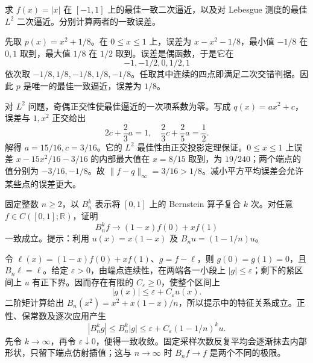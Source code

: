 \begin{exercise}[绝对值函数的两种二次逼近]\label{b2:ex:approximation-absolute-value}
求 \(f(x)=|x|\) 在 \([-1,1]\) 上的最佳一致二次逼近，以及对 Lebesgue 测度的最佳 \(L^2\) 二次逼近。分别计算两者的一致误差。
\end{exercise}
\begin{solution}
先取 \(p(x)=x^2+1/8\)。在 \(0\leq x\leq1\) 上，误差为 \(x-x^2-1/8\)，最小值 \(-1/8\) 在 \(0,1\) 取到，最大值 \(1/8\) 在 \(1/2\) 取到。误差是偶函数，于是它在
\[
 -1,-1/2,0,1/2,1
\]
依次取 \(-1/8,1/8,-1/8,1/8,-1/8\)。任取其中连续的四点即满足二次交错判据。因此 \(p\) 是唯一的最佳一致逼近，误差为 \(1/8\)。

对 \(L^2\) 问题，奇偶正交性使最佳逼近的一次项系数为零。写成 \(q(x)=a x^2+c\)，误差与 \(1,x^2\) 正交给出
\[
 2c+\frac23a=1,\quad \frac23c+\frac25a=\frac12.
\]
解得 \(a=15/16,c=3/16\)。它的 \(L^2\) 最佳性由正交投影定理保证。\(0\leq x\leq1\) 上误差 \(x-15x^2/16-3/16\) 的内部最大值在 \(x=8/15\) 取到，为 \(19/240\)；两个端点的值分别为 \(-3/16,-1/8\)。故 \(\|f-q\|_\infty=3/16>1/8\)。减小平方平均误差会允许某些点的误差更大。
\end{solution}

\begin{exercise}\label{b2:ex:approximation-bernstein-iterates}
固定整数 \(n\geq2\)，以 \(B_n^k\) 表示将 \([0,1]\) 上的 Bernstein 算子复合 \(k\) 次。对任意 \(f\in C([0,1];\mathbb R)\)，证明
\[
 B_n^k f\longrightarrow (1-x)f(0)+xf(1)
\]
一致成立。提示：利用 \(u(x)=x(1-x)\) 及 \(B_nu=(1-1/n)u\)。
\end{exercise}
\begin{solution}
令 \(\ell(x)=(1-x)f(0)+xf(1)\)、\(g=f-\ell\)，则 \(g(0)=g(1)=0\)，且 \(B_n\ell=\ell\)。给定 \(\varepsilon>0\)，由端点连续性，在两端各一小段上 \(|g|\leq\varepsilon\)；剩下的紧区间上 \(u\) 有正下界。因而存在有限的 \(C_\varepsilon\geq0\)，使整个区间上
\[
 |g(x)|\leq\varepsilon+C_\varepsilon u(x).
\]
二阶矩计算给出 \(B_n(x^2)=x^2+x(1-x)/n\)，所以提示中的特征关系成立。正性、保常数及逐次应用产生
\[
 |B_n^k g|\leq B_n^k|g|
 \leq\varepsilon+C_\varepsilon(1-1/n)^ku.
\]
先令 \(k\to\infty\)，再令 \(\varepsilon\downarrow0\)，便得一致收敛。固定采样次数反复平均会逐渐抹去内部形状，只留下端点仿射插值；这与 \(n\to\infty\) 时 \(B_nf\to f\) 是两个不同的极限。
\end{solution}

